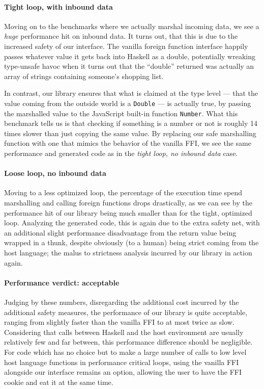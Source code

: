 \documentclass{sigplanconf}
\begin{document}
\paragraph{Tight loop, with inbound data}
Moving on to the benchmarks where we actually marshal incoming data, we see a
\emph{huge} performance hit on inbound data. It turns out, that this is due to
the increased safety of our interface. The vanilla foreign function
interface happily passes whatever value it gets back into Haskell as a double,
potentially wreaking type-unsafe havoc when it turns out that the ``double''
returned was actually an array of strings containing someone's shopping list.

In contrast, our library ensures that what is claimed at the type level --- that
the value coming from the outside world is a \lstinline!Double! --- is actually
true, by passing the marshalled value to the JavaScript built-in function
\lstinline!Number!. What this benchmark tells us is that checking if something
is a number or not is roughly 14 times slower than just copying the same value.
By replacing our safe marshalling function with one that mimics the behavior
of the vanilla FFI, we see the same performance and generated code as in the
\emph{tight loop, no inbound data} case.

\paragraph{Loose loop, no inbound data}
Moving to a less optimized loop, the percentage of the execution time spend
marshalling and calling foreign functions drops drastically, as we can see by
the performance hit of our library being much smaller than for the tight,
optimized loop. Analyzing the generated code, this is again due to the extra
safety net, with an additional slight performance disadvantage from the return
value being wrapped in a thunk, despite obviously (to a human) being strict
coming from the host language; the malus to strictness analysis incurred by
our library in action again.

\paragraph{Performance verdict: acceptable}
Judging by these numbers, disregarding the additional cost incurred by the
additional safety measures, the performance of our library is quite acceptable,
ranging from slightly faster than the vanilla FFI to at most twice as slow.
Considering that calls between Haskell and the host environment are usually
relatively few and far between, this performance difference should be
negligible. For code which has no choice but to make a large number of calls to
low level host language functions in performance critical loops,
using the vanilla FFI alongside our interface remains an option,
allowing the user to have the FFI cookie and eat it at the same time.
\end{document}
